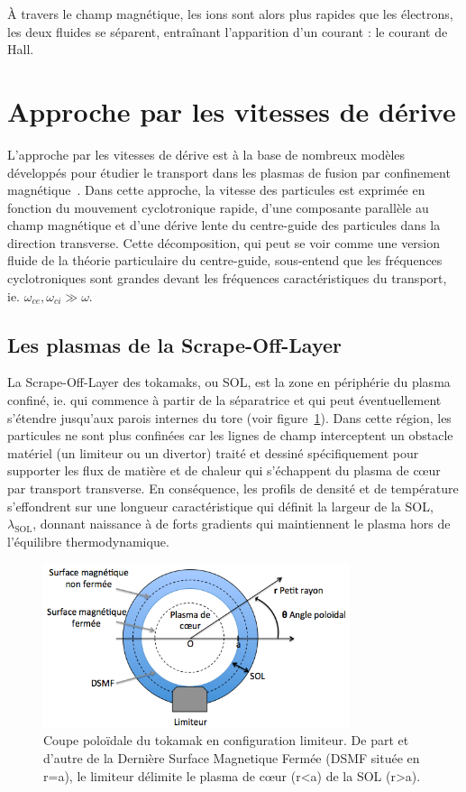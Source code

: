 \begin{refsection}
À travers le champ magnétique, les ions sont alors plus rapides que les
électrons, les deux fluides se séparent, entraînant l'apparition d'un
courant : le courant de Hall. 

\section{Approche par les vitesses de dérive}
\label{vitessesDerive}
L'approche par les vitesses de dérive est à la base de nombreux modèles
développés pour étudier le transport dans les plasmas de fusion par
confinement magnétique~\parencite{Garcia,Bisai,Tamain}. Dans cette approche, la
vitesse des particules est exprimée en fonction du mouvement cyclotronique rapide, d'une composante
parallèle au champ magnétique et d'une dérive lente du centre-guide des particules dans
la direction transverse. Cette décomposition, qui peut se voir comme une
version fluide de la théorie particulaire du centre-guide, sous-entend que les
fréquences cyclotroniques sont grandes devant les fréquences caractéristiques du
transport, ie. $\omega_{ce},\omega_{ci}\gg\omega$. 
 
\subsection{Les plasmas de la Scrape-Off-Layer}
La Scrape-Off-Layer des tokamaks, ou SOL, est la zone en
périphérie du plasma confiné, ie. qui commence à partir de la séparatrice et qui
peut éventuellement s'étendre jusqu'aux parois internes du tore (voir
figure~\ref{SOL}). Dans cette région, les
particules ne sont plus confinées car les lignes de champ interceptent un
obstacle matériel (un limiteur ou un divertor) traité et dessiné spécifiquement
pour supporter les flux de matière et de chaleur qui s'échappent du plasma de
c\oe ur par transport transverse.
En conséquence, les profils de densité et de température s'effondrent sur une
longueur caractéristique qui définit la largeur de la SOL, $\lambda_\text{SOL}$,
donnant naissance à de forts gradients qui maintiennent le plasma hors
de l'équilibre thermodynamique.

\begin{figure}[!htbp]
    \centering
	\includegraphics[width=0.8\textwidth]{figures/1-SOLLimiter.png}
	\caption{Coupe poloïdale du tokamak en configuration limiteur. De part et
	d'autre de la Dernière Surface Magnetique Fermée (DSMF située en r=a), le
	limiteur délimite le plasma de c\oe ur (r<a) de la SOL (r>a).}\label{SOL}
\end{figure}
 

\end{refsection}
